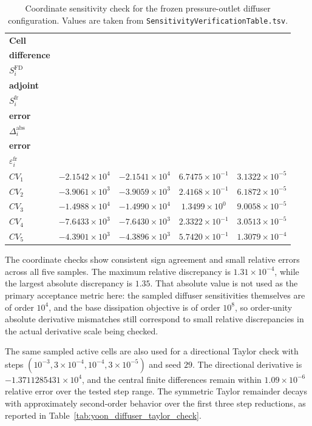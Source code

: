 \begin{table}[!ht]
	\centering
	\scriptsize
	\caption{Coordinate sensitivity check for the frozen pressure-outlet diffuser configuration. Values are taken from \texttt{SensitivityVerificationTable.tsv}.}
	\label{tab:yoon_diffuser_fd_adjoint_comparison}
	\renewcommand{\arraystretch}{1.2}
	\begin{tabular}{l c c c c}
		\hline
		\textbf{Cell} &
		\shortstack{\textbf{Finite}\\\textbf{difference}\\$S_i^{\mathrm{FD}}$} &
		\shortstack{\textbf{Frozen}\\\textbf{adjoint}\\$S_i^{\mathrm{fr}}$} &
		\shortstack{\textbf{Absolute}\\\textbf{error}\\$\Delta_i^{\mathrm{abs}}$} &
		\shortstack{\textbf{Relative}\\\textbf{error}\\$\varepsilon_i^{\mathrm{fr}}$} \\
		\hline
		$CV_1$ & $-2.1542\times10^{4}$ & $-2.1541\times10^{4}$ & $6.7475\times10^{-1}$ & $3.1322\times10^{-5}$ \\
		$CV_2$ & $-3.9061\times10^{3}$ & $-3.9059\times10^{3}$ & $2.4168\times10^{-1}$ & $6.1872\times10^{-5}$ \\
		$CV_3$ & $-1.4988\times10^{4}$ & $-1.4990\times10^{4}$ & $1.3499\times10^{0}$ & $9.0058\times10^{-5}$ \\
		$CV_4$ & $-7.6433\times10^{3}$ & $-7.6430\times10^{3}$ & $2.3322\times10^{-1}$ & $3.0513\times10^{-5}$ \\
		$CV_5$ & $-4.3901\times10^{3}$ & $-4.3896\times10^{3}$ & $5.7420\times10^{-1}$ & $1.3079\times10^{-4}$ \\
		\hline
	\end{tabular}
\end{table}

	The coordinate checks show consistent sign agreement and small relative errors across all five samples. The maximum relative discrepancy is $1.31\times10^{-4}$, while the largest absolute discrepancy is $1.35$. That absolute value is not used as the primary acceptance metric here: the sampled diffuser sensitivities themselves are of order $10^{4}$, and the base dissipation objective is of order $10^{8}$, so order-unity absolute derivative mismatches still correspond to small relative discrepancies in the actual derivative scale being checked.

	The same sampled active cells are also used for a directional Taylor check with steps $(10^{-3},3\times10^{-4},10^{-4},3\times10^{-5})$ and seed $29$. The directional derivative is
	$-1.3711285431\times10^{4}$, and the central finite differences remain within $1.09\times10^{-6}$ relative error over the tested step range. The symmetric Taylor remainder decays with approximately second-order behavior over the first three step reductions, as reported in Table~\ref{tab:yoon_diffuser_taylor_check}.


